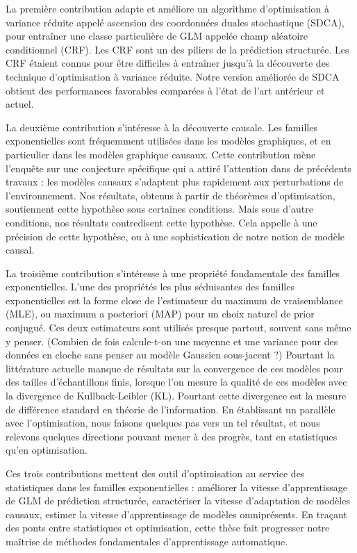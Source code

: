 \documentclass[12pt]{report} %
\numberwithin{equation}{chapter}
\numberwithin{table}{chapter}
\numberwithin{figure}{chapter}
\begin{document}
La première contribution adapte et améliore un algorithme d'optimisation à variance réduite appelé ascension des coordonnées duales stochastique (SDCA), pour entraîner une classe particulière de GLM appelée champ aléatoire conditionnel (CRF). Les CRF sont un des piliers de la prédiction structurée. Les CRF étaient connus pour être difficiles à entraîner jusqu'à la découverte des technique d'optimisation à variance réduite. Notre version améliorée de SDCA  obtient des performances favorables comparées à l'état de l'art antérieur et actuel.

La deuxième contribution s'intéresse à la découverte causale.
Les familles exponentielles sont fréquemment utilisées dans les modèles graphiques, et en particulier dans les modèles graphique causaux.
Cette contribution mène l'enquête sur une conjecture spécifique qui a attiré l'attention dans de précédents travaux : les modèles causaux s'adaptent plus rapidement aux perturbations de l'environnement.
Nos résultats, obtenus à partir de théorèmes d'optimisation, soutiennent cette hypothèse sous certaines conditions. Mais sous d'autre conditions, nos résultats contredisent cette hypothèse. Cela appelle à une précision de cette hypothèse, ou à une sophistication de notre notion de modèle causal.

La troisième contribution s'intéresse à une propriété fondamentale des familles exponentielles.
L'une des propriétés les plus séduisantes des familles exponentielles est la forme close de l'estimateur du maximum de vraisemblance (MLE), ou maximum a posteriori (MAP) pour un choix naturel de prior conjugué.
Ces deux estimateurs sont utilisés presque partout, souvent sans même y penser.
(Combien de fois calcule-t-on une moyenne et une variance pour des données en cloche sans penser au modèle Gaussien sous-jacent ?)
Pourtant la littérature actuelle manque de résultats sur la convergence de ces modèles pour des tailles d'échantillons finis, lorsque l'on mesure la qualité de ces modèles avec la divergence  de Kullback-Leibler (KL).
Pourtant cette divergence est la mesure de différence standard en théorie de l'information.
En établissant un parallèle avec l'optimisation, nous faisons quelques pas vers un tel résultat, et nous relevons quelques directions pouvant mener à des progrès, tant en statistiques qu'en optimisation.

Ces trois contributions mettent des outil d'optimisation au service des statistiques dans les familles exponentielles : améliorer la vitesse d'apprentissage de GLM de prédiction structurée, caractériser la vitesse d'adaptation de modèles causaux, estimer la vitesse d'apprentissage de modèles omniprésents.
En traçant des ponts entre statistiques et optimisation, cette thèse fait progresser notre maîtrise de méthodes fondamentales d'apprentissage automatique.
\end{document}
